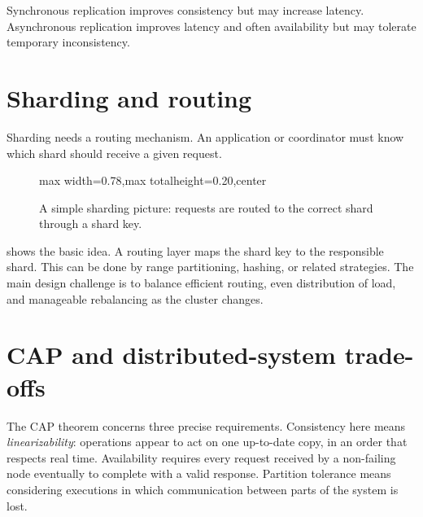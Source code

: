 \documentclass[11pt,a4paper,openany]{book}
\begin{document}
Synchronous replication improves consistency but may increase latency. Asynchronous replication improves latency and often availability but may tolerate temporary inconsistency.

\section{Sharding and routing}
Sharding needs a routing mechanism. An application or coordinator must know which shard should receive a given request.

\begin{figure}[tbp]
\centering
\begin{adjustbox}{max width=0.78\linewidth,max totalheight=0.20\textheight,center}
\end{adjustbox}
\caption{A simple sharding picture: requests are routed to the correct shard through a shard key.}
\label{fig:dw-sharding-routing}
\end{figure}

 shows the basic idea. A routing layer maps the shard key to the responsible shard. This can be done by range partitioning, hashing, or related strategies. The main design challenge is to balance efficient routing, even distribution of load, and manageable rebalancing as the cluster changes.

\section{CAP and distributed-system trade-offs}
The CAP theorem concerns three precise requirements. Consistency here means \emph{linearizability}: operations appear to act on one up-to-date copy, in an order that respects real time. Availability requires every request received by a non-failing node eventually to complete with a valid response. Partition tolerance means considering executions in which communication between parts of the system is lost.
\end{document}

